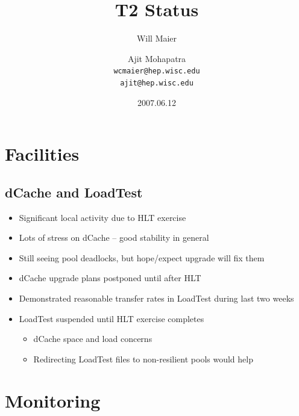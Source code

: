 \documentclass{beamer}
\title{T2 Status}
\author[Maier, Mohapatra]{
    Will Maier \and Ajit Mohapatra\\ 
    {\tt wcmaier@hep.wisc.edu}\\
    {\tt ajit@hep.wisc.edu}}
\institute[Wisconsin]{University of Wisconsin - High Energy Physics}
\date{2007.06.12}
\begin{document}
\begin{frame}
    \titlepage
\end{frame}


\section{Facilities}
\subsection{dCache and LoadTest}
\begin{frame}
\begin{itemize}
    \item Significant local activity due to HLT exercise
    \item Lots of stress on dCache -- good stability in general
    \item Still seeing pool deadlocks, but hope/expect upgrade will fix them
    \item dCache upgrade plans postponed until after HLT
    \item Demonstrated reasonable transfer rates in LoadTest during last two weeks
    \item LoadTest suspended until HLT exercise completes
    \begin{itemize}
        \item dCache space and load concerns
        \item Redirecting LoadTest files to non-resilient pools would help
    \end{itemize}
\end{itemize}
\end{frame}

\section{Monitoring}
\end{document}
